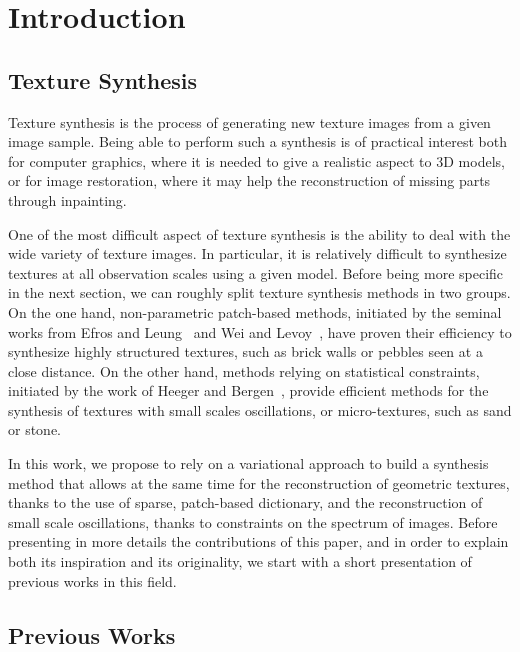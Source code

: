 \section{Introduction}
\label{sec:intro}


\subsection{Texture Synthesis}

Texture synthesis is the process of generating new texture images from a given image sample.
Being able to perform such a synthesis is of practical interest both for computer graphics, where it is needed to give a realistic aspect to 3D models, or for image restoration, where it may help the reconstruction of missing parts through inpainting.

One of the most difficult aspect of texture synthesis is the ability to deal with the wide variety of texture images.
In particular, it is relatively difficult to synthesize textures at all observation scales using a given model.
Before being more specific in the next section, we can roughly split texture synthesis methods in two groups.
On the one hand, non-parametric patch-based methods, initiated by the seminal works from Efros and Leung~\cite{efros1999texture} and Wei and Levoy~\cite{wei2000fast}, have proven their efficiency to synthesize highly structured textures, such as brick walls or pebbles seen at a close distance.
On the other hand, methods relying on statistical constraints, initiated by the work of Heeger and Bergen~\cite{Heeger1995}, provide efficient methods for the synthesis of textures with small scales oscillations, or micro-textures, such as sand or stone.

In this work, we propose to rely on a variational approach to build a synthesis method that allows at the same time for the reconstruction of geometric textures, thanks to the use of sparse, patch-based dictionary, and the reconstruction of small scale oscillations, thanks to constraints on the spectrum of images.
Before presenting in more details the contributions of this paper, and in order to explain both its inspiration and its originality, we start with a short presentation of previous works in this field.


\subsection{Previous Works}
\label{sub:prev-works}



